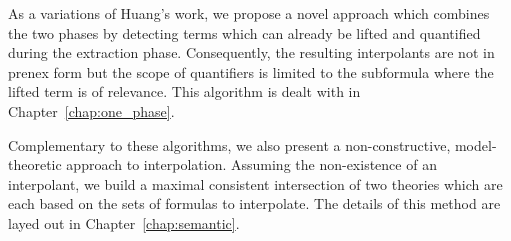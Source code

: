 As a variations of Huang's work, we propose a novel approach which combines the two phases by detecting terms which can already be lifted and quantified during the extraction phase.
Consequently, the resulting interpolants are not in prenex form but the scope of quantifiers is limited to the subformula where the lifted term is of relevance.
This algorithm is dealt with in Chapter~\ref{chap:one_phase}.

Complementary to these algorithms, we also present a non-constructive, model-theoretic approach to interpolation.
Assuming the non-existence of an interpolant, we build a maximal consistent intersection of two theories which are each based on the sets of formulas to interpolate. The details of this method are layed out in Chapter~\ref{chap:semantic}.



